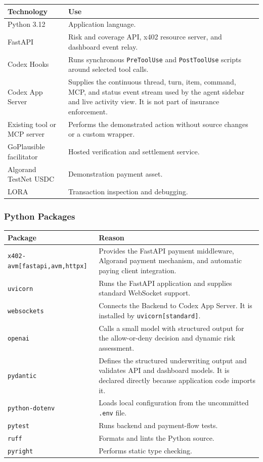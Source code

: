 \documentclass[11pt]{article}
\begin{document}
\begin{tabularx}{\textwidth}{@{}lX@{}}
\toprule
\textbf{Technology} & \textbf{Use} \\
\midrule
Python 3.12 & Application language. \\
FastAPI & Risk and coverage API, x402 resource server, and dashboard event relay. \\
Codex Hooks & Runs synchronous \texttt{PreToolUse} and \texttt{PostToolUse}
scripts around selected tool calls. \\
Codex App Server & Supplies the continuous thread, turn, item, command, MCP, and
status event stream used by the agent sidebar and live activity view. It is not
part of insurance enforcement. \\
Existing tool or MCP server & Performs the demonstrated action without source
changes or a custom wrapper. \\
GoPlausible facilitator & Hosted verification and settlement service. \\
Algorand TestNet USDC & Demonstration payment asset. \\
LORA & Transaction inspection and debugging. \\
\bottomrule
\end{tabularx}

\subsubsection{Python Packages}

\begin{tabularx}{\textwidth}{@{}lX@{}}
\toprule
\textbf{Package} & \textbf{Reason} \\
\midrule
\texttt{x402-avm[fastapi,avm,httpx]} &
Provides the FastAPI payment middleware, Algorand payment mechanism, and
automatic paying client integration. \\
\texttt{uvicorn} &
Runs the FastAPI application and supplies standard WebSocket support. \\
\texttt{websockets} &
Connects the Backend to Codex App Server. It is installed by
\texttt{uvicorn[standard]}. \\
\texttt{openai} &
Calls a small model with structured output for the allow-or-deny decision and
dynamic risk assessment. \\
\texttt{pydantic} &
Defines the structured underwriting output and validates API and dashboard
models. It is declared directly because application code imports it. \\
\texttt{python-dotenv} &
Loads local configuration from the uncommitted \texttt{.env} file. \\
\texttt{pytest} &
Runs backend and payment-flow tests. \\
\texttt{ruff} &
Formats and lints the Python source. \\
\texttt{pyright} &
Performs static type checking. \\
\bottomrule
\end{tabularx}
\end{document}
